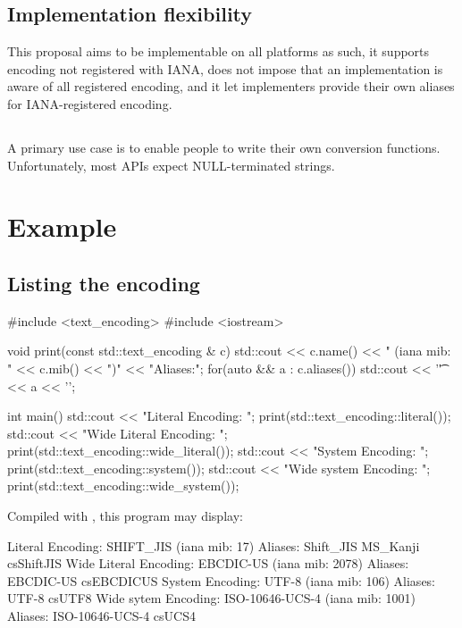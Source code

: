 \documentclass{wg21}
\begin{document}
\subsection{Implementation flexibility}

This proposal aims to be implementable on all platforms as such, it supports encoding not registered with IANA, does not impose that
an implementation is aware of all registered encoding, and it let implementers provide their own aliases for IANA-registered encoding.

\subsection{}

A primary use case is to enable people to write their own conversion functions.
Unfortunately, most APIs expect NULL-terminated strings. 

\section{Example}

\subsection{Listing the encoding}

\begin{codeblock}

#include <text_encoding>
#include <iostream>

void print(const std::text_encoding & c) {
	std::cout << c.name()
	<< " (iana mib: " << c.mib() << ")\n"
	<< "Aliases:\n";
	for(auto && a : c.aliases()) {
		std::cout << '\t' << a << '\n';
	}
}

int main() {
	std::cout << "Literal Encoding: ";
	print(std::text_encoding::literal());
	std::cout << "Wide Literal Encoding: ";
	print(std::text_encoding::wide_literal());
	std::cout << "System Encoding: ";
	print(std::text_encoding::system());
	std::cout << "Wide system Encoding: ";
	print(std::text_encoding::wide_system());
}
\end{codeblock}

Compiled with , this program may display:

\begin{codeblock}
Literal Encoding: SHIFT_JIS (iana mib: 17)
Aliases:
	Shift_JIS
	MS_Kanji
	csShiftJIS
Wide Literal Encoding: EBCDIC-US (iana mib: 2078)
Aliases:
	EBCDIC-US
	csEBCDICUS
System Encoding: UTF-8 (iana mib: 106)
Aliases:
	UTF-8
	csUTF8
Wide sytem Encoding: ISO-10646-UCS-4 (iana mib: 1001)
Aliases:
	ISO-10646-UCS-4
	csUCS4
\end{codeblock}
\end{document}
